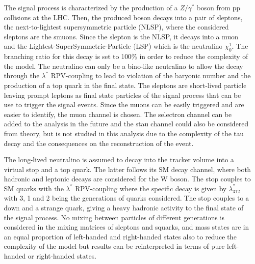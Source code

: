 \documentclass{cernatlasnote}
\begin{document}
The signal process is characterized by the production of a $Z/\gamma^*$ boson from pp collisions at the LHC. Then, the produced boson decays into a pair of sleptons, the next-to-lightest supersymmetric particle (NLSP), where the considered sleptons are the smuons. Since the slepton is the NLSP, it decays into a muon and the Lightest-SuperSymmetric-Particle (LSP) which is the neutralino $ \chi^{1}_{0}$. The branching ratio for this decay is set to 100\% in order to reduce the complexity of the model. The neutralino can only be a bino-like neutralino to allow the decay through the $\lambda^{''}$ RPV-coupling to lead to violation of the baryonic number and the production of a top quark in the final state. The sleptons are short-lived particle leaving  prompt leptons as final state particles of the signal process that can be use to trigger the signal events. Since the muons can be easily triggered and are easier to identify, the muon channel is chosen. The selectron channel can be added to the analysis in the future and the stau channel could also be considered from theory, but is not studied in this analysis due to the complexity of the tau decay and the consequences on the reconstruction of the event.

The long-lived neutralino is assumed to decay into the tracker volume into a virtual stop and a top quark. The latter follows its SM decay channel, where both hadronic and leptonic decays are considered for the W boson. The stop couples to SM quarks with the $\lambda^{''}$ RPV-coupling where the specific decay is given by $\lambda^{''}_{312}$ with 3, 1 and 2 being the generations of quarks considered. The stop couples to a down and a strange quark, giving a heavy hadronic activity to the final state of the signal process. No mixing between particles of different generations is considered in the mixing matrices of sleptons and squarks, and mass states are in an equal proportion of left-handed and right-handed states also to reduce the complexity of the model but results can be reinterpreted in terms of pure left-handed or right-handed states.
\end{document}
